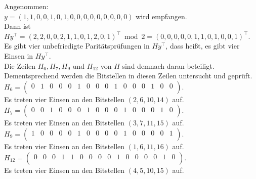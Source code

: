     \begin{Beispiel}
        Angenommen:\\
        $y = (1,1,0,0,1,0,1,0,0,0,0,0,0,0,0,0)$
        wird empfangen.\\
        
        Dann ist $Hy^\intercal = (2,2,0,0,2,1,1,0,1,2,0,1)^\intercal \bmod 2 =(0,0,0,0,0,1,1,0,1,0,0,1)^\intercal$.\\
        
        Es gibt vier unbefriedigte Paritätsprüfungen in $Hy^\intercal$, dass hei\ss{}t, es gibt vier Einsen in $Hy^\intercal.$\\
        Die Zeilen $H_6, H_7, H_9$ und $H_{12}$ von $H$ sind demnach daran beteiligt.\\ Dementsprechend werden die Bitstellen in diesen Zeilen untersucht und geprüft.\\
        
        
        $H_6= \left( \begin{array}{rrrrrrrrrrrrrrrr}
            0 & 1 & 0 & 0 & 0 & 1 & 0 & 0 & 0 & 1 & 0 & 0 & 0 & 1 & 0 & 0 \\
           \end{array}\right). 
        $\\
        Es treten vier Einsen an den Bitstellen $(2, 6, 10, 14)$ auf.\\
        
        $H_7= \left( \begin{array}{rrrrrrrrrrrrrrrr}
            0 & 0 & 1 & 0 & 0 & 0 & 1 & 0 & 0 & 0 & 1 & 0 & 0 & 0 & 1 & 0 \\
           \end{array}\right). 
        $\\
        Es treten vier Einsen an den Bitstellen $(3, 7, 11, 15)$ auf.\\
        
        $H_9= \left( \begin{array}{rrrrrrrrrrrrrrrr}
            1 & 0 & 0 & 0 & 0 & 1 & 0 & 0 & 0 & 0 & 1 & 0 & 0 & 0 & 0 & 1 \\
           \end{array}\right). 
        $\\
        Es treten vier Einsen an den Bitstellen $(1, 6, 11, 16)$ auf.\\
        
        $H_{12}= \left( \begin{array}{rrrrrrrrrrrrrrrr}
            0 & 0 & 0 & 1 & 1 & 0 & 0 & 0 & 0 & 1 & 0 & 0 & 0 & 0 & 1 & 0 \\
           \end{array}\right). 
        $\\
        Es treten vier Einsen an den Bitstellen $(4, 5, 10, 15)$ auf.\\
        

\end{Beispiel}
